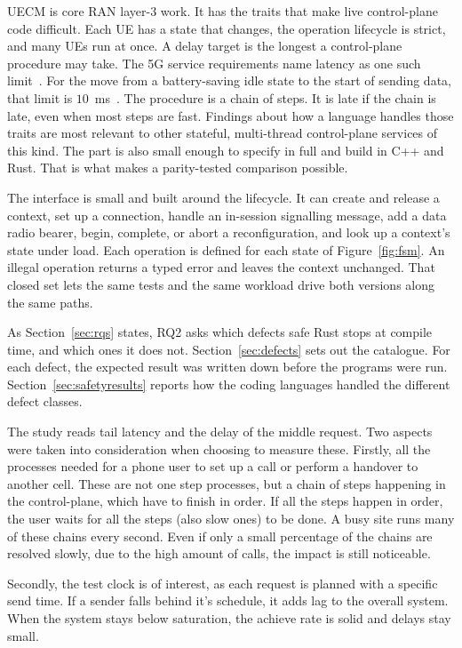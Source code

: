 \documentclass[english,oneside,a4paper,censored,csm,software-track-2020]{HYthesisML}
\begin{document}
UECM is core RAN layer-3 work. It has the traits that make live control-plane
code difficult. Each UE has a state that changes, the operation lifecycle is strict,
and many UEs run at once. A delay target is the longest a control-plane procedure may take.
The 5G service requirements name latency as one such limit~\cite{3gpp22261}.
For the move from a battery-saving idle state to the start of sending data, that limit is $10$~ms~\cite{3gpp38913}.
The procedure is a chain of steps. It is late if the chain is late, even when most steps are fast.
Findings about how a language
handles those traits are most relevant to other stateful, multi-thread
control-plane services of this kind. The part is also small enough to specify in full and build  in C++ and Rust.
That is what makes a parity-tested comparison possible.

The interface is small and built around the lifecycle. It can create and
release a context, set up a connection, handle an in-session signalling
message, add a data radio bearer, begin, complete, or abort a
reconfiguration, and look up a context's state under load. Each
operation is defined for each state of Figure~\ref{fig:fsm}. An illegal operation
returns a typed error and leaves the context unchanged. That closed set lets
the same tests and the same workload drive both versions along the same
paths.

As Section~\ref{sec:rqs} states, RQ2 asks which defects safe Rust stops at compile
time, and which ones it does not. Section~\ref{sec:defects} sets out the catalogue. For each defect, the expected
result was written down before the programs were run.
Section~\ref{sec:safetyresults} reports how the coding languages handled the different defect classes.

The study reads tail latency and the delay of the middle request. Two aspects were taken into consideration 
when choosing to measure these. 
Firstly, all the processes needed for a phone user to set up a call or perform a handover 
to another cell. These are not one step processes, but a chain of steps happening in the 
control-plane, which have to finish in order.  If all the steps happen in order, 
the user waits for all the steps (also slow ones) to be done. A busy site runs many of 
these chains every second. Even if only a small percentage of the chains are 
resolved slowly, due to the high amount of calls, the impact is still noticeable. 

Secondly, the test clock is of interest, as each request is planned with a specific send time. 
If a sender falls behind it's schedule, it adds lag to the overall system. When the system stays 
below saturation, the achieve rate is solid and delays stay small.
\end{document}
